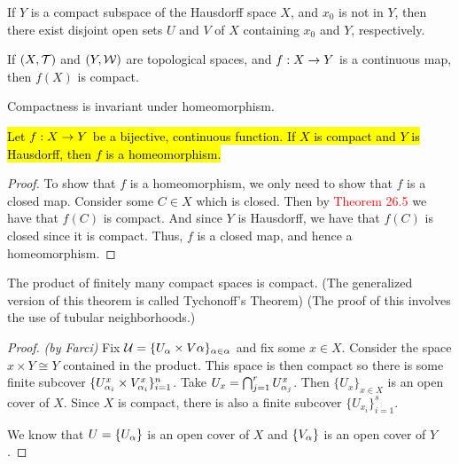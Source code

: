 \vs

\begin{lem}
If $Y$ is a compact subspace of the Hausdorff space $X$, and $x_0$ is not in $Y$, then there exist disjoint open sets $U$ and $V$ of $X$ containing $x_0$ and $Y$, respectively.
\end{lem}

\vs

\begin{thm}
If $(X,\mathcal{T})$ and $(Y, \mathcal{W})$ are topological spaces, and $f:X\rightarrow Y$ is a continuous map, then $f(X)$ is compact.
\end{thm}

\vs

 Compactness is invariant under homeomorphism.


\vs

\begin{thm}
\hl{Let $f:X\rightarrow Y$ be a bijective, continuous function. If $X$ is compact and $Y$ is Hausdorff, then $f$ is a homeomorphism.}
\end{thm}

\begin{proof}
To show that $f$ is a homeomorphism, we only need to show that $f$ is a closed map. Consider some $C\in X$ which is closed. Then by \textcolor{red}{Theorem 26.5} we have that $f(C)$ is compact. And since $Y$ is Hausdorff, we have that $f(C)$ is closed since it is compact. Thus, $f$ is a closed map, and hence a homeomorphism.
\end{proof}

\vs

\begin{thm}
The product of finitely many compact spaces is compact. (The generalized version of this theorem is called Tychonoff's Theorem) (The proof of this involves the use of tubular neighborhoods.)
\end{thm}

\begin{proof}\textit{(by Farci)}
Fix $\mathcal{U} = \{U_\alpha\times V\alpha\}_{\alpha\in \alpha}$ and fix some $x\in X$. Consider the space $x\times Y\cong Y$ contained in the product. This space is then compact so there is some finite subcover $\{U_{\alpha_i}^x\times V_{\alpha_i}^x\}_{i = 1}^n$. Take $U_x = \bigcap_{j = 1}^r U_{\alpha_j}^x$. Then $\{U_x\}_{x\in X}$ is an open cover of $X$. Since $X$ is compact, there is also a finite subcover $\{U_{x_i}\}_{i = 1}^s$.



We know that $U = \{U_\alpha\}$ is an open cover of $X$ and $\{V_\alpha\}$ is an open cover of $Y$.
\end{proof}


